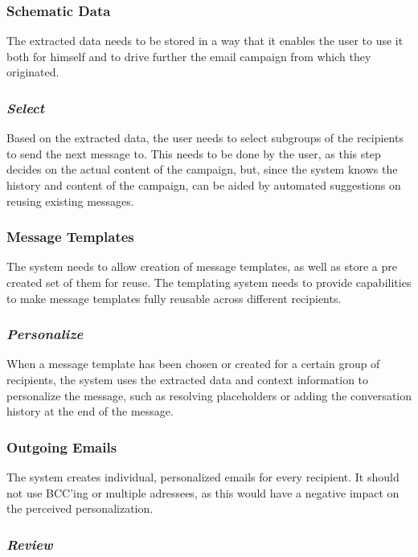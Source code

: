 \subsubsection*{Schematic Data}

The extracted data needs to be stored in a way that it enables the user to use it both for himself and to drive further the email campaign from which they originated.

\subsubsection*{\emph{Select}}

Based on the extracted data, the user needs to select subgroups of the recipients to send the next message to. This needs to be done by the user, as this step decides on the actual content of the campaign, but, since the system knows the history and content of the campaign, can be aided by automated suggestions on reusing existing messages.

\subsubsection*{Message Templates}

The system needs to allow creation of message templates, as well as store a pre created set of them for reuse. The templating system needs to provide capabilities to make message templates fully reusable across different recipients.

\subsubsection*{\emph{Personalize}}

When a message template has been chosen or created for a certain group of recipients, the system uses the extracted data and context information to personalize the message, such as resolving placeholders or adding the conversation history at the end of the message.

\subsubsection*{Outgoing Emails}

The system creates individual, personalized emails for every recipient. It should not use BCC’ing or multiple adressees, as this would have a negative impact on the perceived personalization.

\subsubsection*{\emph{Review}}

